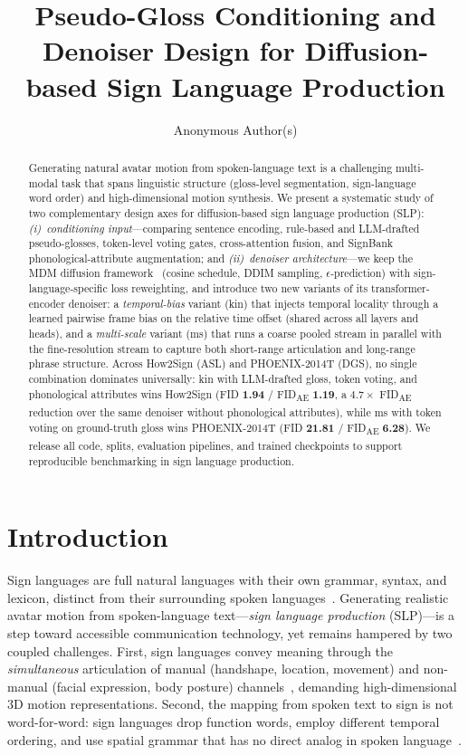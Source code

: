 \documentclass{article}
\title{Pseudo-Gloss Conditioning and Denoiser Design for Diffusion-based Sign Language Production}
\author{%
  Anonymous Author(s)
}
\begin{document}
\maketitle

\begin{abstract}
Generating natural avatar motion from spoken-language text is a challenging multi-modal task that spans linguistic structure (gloss-level segmentation, sign-language word order) and high-dimensional motion synthesis.
We present a systematic study of two complementary design axes for diffusion-based sign language production (SLP):
\emph{(i)~conditioning input}---comparing sentence encoding, rule-based and LLM-drafted pseudo-glosses, token-level voting gates, cross-attention fusion, and SignBank phonological-attribute augmentation; and
\emph{(ii)~denoiser architecture}---we keep the MDM diffusion framework~\citep{tevet2023human} (cosine schedule, DDIM sampling, $\epsilon$-prediction) with sign-language-specific loss reweighting, and introduce two new variants of its transformer-encoder denoiser: a \emph{temporal-bias} variant (kin) that injects temporal locality through a learned pairwise frame bias on the relative time offset (shared across all layers and heads), and a \emph{multi-scale} variant (ms) that runs a coarse pooled stream in parallel with the fine-resolution stream to capture both short-range articulation and long-range phrase structure.
Across How2Sign (ASL) and PHOENIX-2014T (DGS), no single combination dominates universally:
kin with LLM-drafted gloss, token voting, and phonological attributes wins How2Sign (FID \textbf{1.94} / FID\textsubscript{AE} \textbf{1.19}, a $4.7\times$ FID\textsubscript{AE} reduction over the same denoiser without phonological attributes), while ms with token voting on ground-truth gloss wins PHOENIX-2014T (FID \textbf{21.81} / FID\textsubscript{AE} \textbf{6.28}).
We release all code, splits, evaluation pipelines, and trained checkpoints to support reproducible benchmarking in sign language production.
\end{abstract}

\section{Introduction}
\label{sec:intro}

Sign languages are full natural languages with their own grammar, syntax, and lexicon, distinct from their surrounding spoken languages~\citep{stokoe1960sign,sandler2006sign}.
Generating realistic avatar motion from spoken-language text---\emph{sign language production} (SLP)---is a step toward accessible communication technology, yet remains hampered by two coupled challenges.
First, sign languages convey meaning through the \emph{simultaneous} articulation of manual (handshape, location, movement) and non-manual (facial expression, body posture) channels~\citep{brentari1998prosodic}, demanding high-dimensional 3D motion representations.
Second, the mapping from spoken text to sign is not word-for-word: sign languages drop function words, employ different temporal ordering, and use spatial grammar that has no direct analog in spoken language~\citep{sandler2006sign}.
\end{document}
